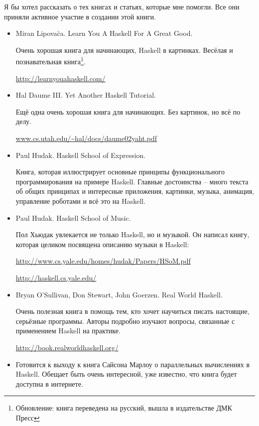 Я бы хотел рассказать о тех книгах и статьях, которые 
мне помогли. Все они приняли активное участие в 
создании этой книги.


\begin{itemize}
\item Miran Lipova\u{c}a. Learn You A Haskell For A Great Good.
        
    Очень хорошая книга для начинающих, Haskell в картинках.
    Весёлая и познавательная книга\footnote{Обновление: книга переведена 
    на русский, вышла в издательстве ДМК Пресс}.

    \url{http://learnyouahaskell.com/}

\item Hal Daume III. Yet Another Haskell Tutorial.

    Ещё одна очень хорошая книга для начинающих. 
    Без картинок, но всё по делу. 

    \url{www.cs.utah.edu/~hal/docs/daume02yaht.pdf}

\item Paul Hudak. Haskell School of Expression.
    
    Книга, которая иллюстрирует основные принципы
    функционального программирования на примере Haskell.
    Главные достоинства -- много текста об общих 
    принципах и интересные приложения,
    картинки, музыка, анимация, управление роботами и 
    всё это на Haskell.

\item Paul Hudak. Haskell School of Music.

    Пол Хьюдак увлекается не только Haskell, но и музыкой.
    Он написал книгу, которая целиком посвящена описанию музыки в Haskell:

    \url{http://www.cs.yale.edu/homes/hudak/Papers/HSoM.pdf}

    \url{http://haskell.cs.yale.edu/}

\item Bryan O'Sullivan, Don Stewart, John Goerzen. Real World Haskell.

    Очень полезная книга в помощь тем, кто хочет научиться
    писать настоящие, серьёзные программы. Авторы подробно
    изучают вопросы, связанные с применением Haskell на практике.
    
    \url{http://book.realworldhaskell.org/}

\item Готовится к выходу к книга Сайсона Марлоу о 
    параллельных вычислениях в Haskell. Обещает
    быть очень интересной, уже известно, что книга
    будет доступна в интернете.

\end{itemize}

